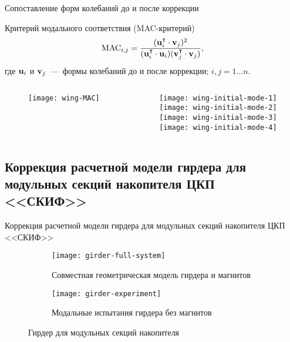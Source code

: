 \begin{frame}{Сопоставление форм колебаний до и после коррекции}
	\begin{block}{Критерий модального соответствия (MAC-критерий)}
		\begin{equation}
			\mathrm{MAC}_{i, j} = \frac{(\mathbf{u}_i ^ \intercal \cdot \mathbf{v}_j) ^ 2}{(\mathbf{u}_i ^ \intercal \cdot \mathbf{u}_i) (\mathbf{v}_j ^ \intercal \cdot \mathbf{v}_j)}, 
		\end{equation}
		где $ \mathbf{u}_i $ и $ \mathbf{v}_j $~---~формы колебаний до и после коррекции; $ i, j = 1 \hdots n $.
	\end{block}
	\vspace{-0.5em}
	\begin{columns}
		\begin{column}{0.49\textwidth}
			\centering
			\begin{figure}
				\texttt{[image: wing-MAC]}
			\end{figure}
		\end{column}
		\begin{column}{0.4\textwidth}
			\centering
			\begin{figure}
				\texttt{[image: wing-initial-mode-1]} \\ \vspace{0.2em}
				\texttt{[image: wing-initial-mode-2]} \\ \vspace{0.2em}
				\texttt{[image: wing-initial-mode-3]} \\ \vspace{0.2em}
				\texttt{[image: wing-initial-mode-4]}
			\end{figure}
		\end{column}
	\end{columns}
\end{frame}

\subsection{Коррекция расчетной модели гирдера для модульных секций накопителя ЦКП <<СКИФ>>}

\begin{frame}{Коррекция расчетной модели гирдера для модульных секций накопителя ЦКП <<СКИФ>>}
	\begin{figure}
		\begin{subfigure}[b]{0.49\textwidth}
			\centering
	     	\texttt{[image: girder-full-system]} 
	     	\caption{Совместная геометрическая модель гирдера и магнитов}
	    \end{subfigure}
    	\hfill
	    \begin{subfigure}[b]{0.49\textwidth}
			\centering
			\texttt{[image: girder-experiment]}
			\caption{Модальные испытания гирдера без магнитов}
	    \end{subfigure}
	    \caption{Гирдер для модульных секций накопителя}
	\end{figure}
\end{frame}

